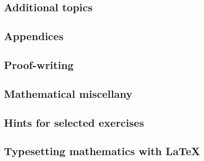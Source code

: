 \documentclass[10pt]{book}
\begin{document}
\chapter{Additional topics}
    \label{chAdditionalTopics}
    

\appendix
\begin{appendices}
\renewcommand{\sectionmark}[1]{\markboth{\leftmark}{Section \thesection.\ #1}}
\renewcommand{\chaptermark}[1]{\markboth{Appendix \thechapter.\ #1}{\rightmark}}

\part*{Appendices}

\chapter{Proof-writing}
    \label{apxWriting}
    \renewcommand\chaptername{Proof-writing}
    

\chapter{Mathematical miscellany}    
    \label{apxMiscellany}
    \renewcommand\chaptername{Mathematical miscellany}
    

\chapter{Hints for selected exercises}
    \label{apxHints}
    \renewcommand\chaptername{Hints to selected exercises}
    

\chapter{Typesetting mathematics with \LaTeX{}}
    \label{apxLaTeX}
    \renewcommand\chaptername{Typesetting mathematics with \LaTeX{}}
    

\end{appendices}
\end{document}
